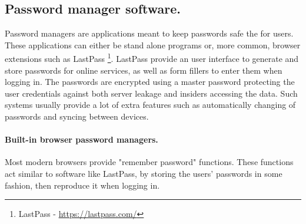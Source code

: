 \subsection{Password manager software.} \label{subsec:pms}
Password managers are applications meant to keep passwords safe the for users. These applications can either be stand alone programs or, more common, browser extensions such as LastPass \footnote{LastPass - \url{https://lastpass.com/}}. LastPass provide an user interface to generate and store passwords for online services, as well as form fillers to enter them when logging in. The passwords are encrypted using a master password protecting the user credentials against both server leakage and insiders accessing the data. Such systems usually provide a lot of extra features such as automatically changing of passwords and syncing between devices. 

\paragraph{Built-in browser password managers.} Most modern browsers provide "remember password" functions. These functions act similar to software like LastPass, by storing the users' passwords in some fashion, then reproduce it when logging in. 

